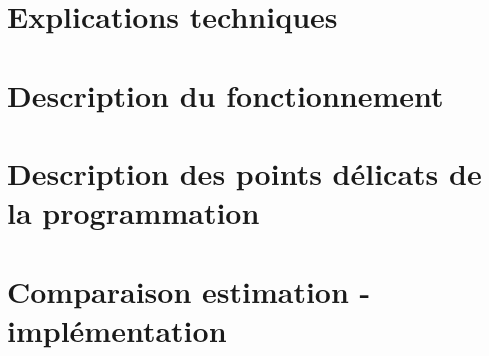 \documentclass[11pt]{article}
\begin{document}
\section{Explications techniques}

\section{Description du fonctionnement}

\section{Description des points délicats de la programmation}

\section{Comparaison estimation - implémentation}
\end{document}
